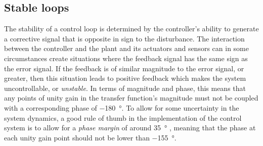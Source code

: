 \subsection{\label{sec:gain-phase-margin}Stable loops}
The stability of a control loop is determined by the controller's ability to generate a corrective signal that is opposite in sign to the disturbance. The interaction between the controller and the plant and its actuators and sensors can in some circumstances create situations where the feedback signal has the same sign as the error signal. If the feedback is of similar magnitude to the error signal, or greater, then this situation leads to positive feedback which makes the system uncontrollable, or \emph{unstable}. In terms of magnitude and phase, this means that any points of unity gain in the transfer function's magnitude must not be coupled with a corresponding phase of \SI{-180}{\degree}. To allow for some uncertainty in the system dynamics, a good rule of thumb in the implementation of the control system is to allow for a \emph{phase margin} of around \SI{35}{\degree} \cite{Freise2003}, meaning that the phase at each unity gain point should not be lower than \SI{-155}{\degree}.